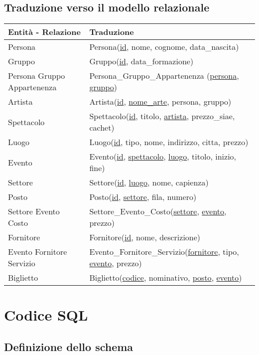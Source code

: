 \documentclass[a4paper,11pt]{article}
\begin{document}
\subsection{Traduzione verso il modello relazionale}
\begin{tabularx}{\textwidth}{|X|>{\raggedright\arraybackslash}X|}
\hline
  \textbf{Entità - Relazione} & \textbf{Traduzione}\\
\hline
  Persona & Persona(\underline{id}, nome, cognome, data\_nascita) \\
\hline
  Gruppo & Gruppo(\underline{id}, data\_formazione) \\
\hline
  Persona Gruppo Appartenenza & Persona\_Gruppo\_Appartenenza (\underline{persona}, \underline{gruppo}) \\
\hline
  Artista & Artista(\underline{id}, \underline{nome\_arte}, persona, gruppo) \\
\hline
  Spettacolo & Spettacolo(\underline{id}, titolo, \underline{artista}, prezzo\_siae, cachet) \\
\hline
  Luogo & Luogo(\underline{id}, tipo, nome, indirizzo, citta, prezzo) \\
\hline
  Evento & Evento(\underline{id}, \underline{spettacolo}, \underline{luogo}, titolo, inizio, fine) \\
\hline
  Settore & Settore(\underline{id}, \underline{luogo}, nome, capienza) \\
\hline
  Posto & Posto(\underline{id}, \underline{settore}, fila, numero) \\
\hline
  Settore Evento Costo & Settore\_Evento\_Costo(\underline{settore}, \underline{evento}, prezzo) \\
\hline
  Fornitore & Fornitore(\underline{id}, nome, descrizione) \\
\hline
  Evento Fornitore Servizio & Evento\_Fornitore\_Servizio(\underline{fornitore}, tipo, \underline{evento}, prezzo) \\
\hline
  Biglietto & Biglietto(\underline{codice}, nominativo, \underline{posto}, \underline{evento}) \\
\hline
\end{tabularx}

\section{Codice SQL}

\subsection{Definizione dello schema}

\end{document}
